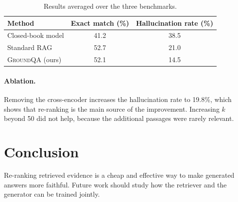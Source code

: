 \documentclass[11pt]{article}
\newcommand{\method}{\textsc{GroundQA}}
\begin{document}
\begin{table}[t]
  \centering
  \begin{tabular}{lcc}
    \toprule
    Method & Exact match (\%) & Hallucination rate (\%) \\
    \midrule
    Closed-book model & 41.2 & 38.5 \\
    Standard RAG & 52.7 & 21.0 \\
    \method{} (ours) & 52.1 & 14.5 \\
    \bottomrule
  \end{tabular}
  \caption{Results averaged over the three benchmarks.}
  \label{tab:results}
\end{table}

\paragraph{Ablation.} Removing the cross-encoder increases the hallucination rate to 19.8\%, which shows that re-ranking is the main source of the improvement.
Increasing $k$ beyond 50 did not help, because the additional passages were rarely relevant.

\section{Conclusion}
Re-ranking retrieved evidence is a cheap and effective way to make generated answers more faithful.
Future work should study how the retriever and the generator can be trained jointly.



\end{document}
